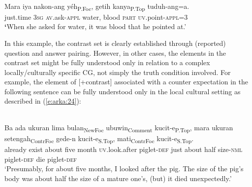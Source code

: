 \documentclass[output=paper
,modfonts
,nonflat]{langsci/langscibook}
\begin{document}
\begin{exe}
	\ex\label{e:arka:23}
	\begin{xlist}
		\label{e:arka:23a}\\
		\gll Mara   iya   nakon-ang   {\ob}yéh{\cb}\textsubscript{P.Foc}, {\ob}getih   kanya{\cb}\textsubscript{P.Top}   tuduh-ang=a.\\
		just.time  3\textsc{sg}   \textsc{av}.ask-\textsc{appl}    \phantom{[}water, \phantom{[}blood   \textsc{part}   \textsc{uv}.point-\textsc{appl}=3\\
		\textbf{‘}When she asked for water, it was blood that he pointed at.’
		\label{e:arka:23b}
	\end{xlist}
\end{exe}

\noindent
In this example, the contrast set is clearly established through (reported) question and answer pairing. However, in other cases, the elements in the contrast set might be fully understood only in relation to a complex locally/culturally specific CG, not simply the truth condition involved. For example, the element of [+contrast] associated with a counter expectation in the following sentence can be fully understood only in the local cultural setting as described in (\ref{e:arka:24}):  

\begin{exe}
	\label{e:arka:24}\\
	\gll {\ob}Ba   ada   {\ob}ukuran   lima   bulan{\cb}\textsubscript{NewFoc} {\ob}ubuwin{\cb}{\cb}\textsubscript{Comment} {\ob}kucit-e{\cb}\textsubscript{P.Top}, {\ob}mara   ukuran   setengah{\cb}\textsubscript{ContrFoc}  {\ob}gede-n   kucit-e{\cb}\textsubscript{S.Top}, {\ob}mati{\cb}\textsubscript{ContrFoc}   {\ob}kucit-e{\cb}\textsubscript{S.Top}.\\
	\phantom{[}already   exist  \phantom{[}about      five  month \phantom{[}\textsc{uv}.look.after  \phantom{[}piglet-\textsc{def} \phantom{[}just    about  half  \phantom{[}size-\textsc{nml}  piglet-\textsc{def} \phantom{[}die      \phantom{[}piglet-\textsc{def}\\
	\glt ‘Presumably, for about five months, I looked after the pig. The size of the pig’s body was about half the size of a mature one’s, (but) it died unexpectedly.’
\end{exe}
\end{document}
